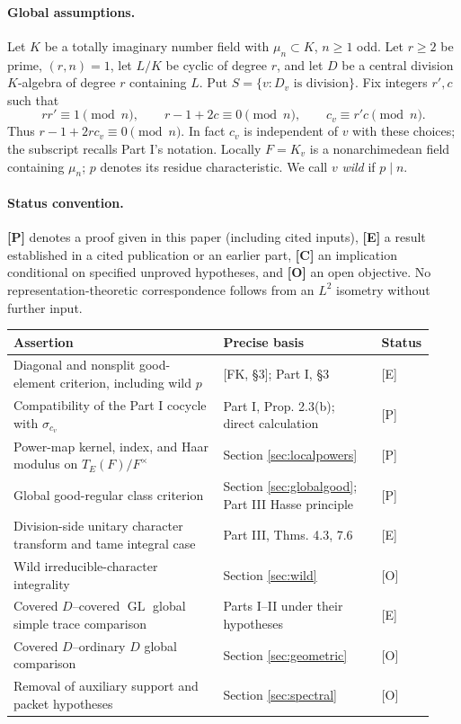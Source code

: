 \documentclass[11pt]{article}
\newcommand{\GL}{\operatorname{GL}}
\theoremstyle{plain}
\theoremstyle{definition}
\begin{document}
\paragraph{Global assumptions.}
Let $K$ be a totally imaginary number field with $\mu_n\subset K$,
$n\geq1$ odd.  Let $r\geq2$ be prime, $(r,n)=1$, let $L/K$ be cyclic
of degree $r$, and let $D$ be a central division $K$-algebra of
degree $r$ containing $L$.  Put $S=\{v:D_v\text{ is division}\}$.
Fix integers $r',c$ such that
\begin{equation}\label{eq:parameters}
 rr'\equiv1\pmod n,\qquad r-1+2c\equiv0\pmod n,
 \qquad c_v\equiv r'c\pmod n.
\end{equation}
Thus $r-1+2rc_v\equiv0\pmod n$.  In fact $c_v$ is independent
of $v$ with these choices; the subscript recalls Part I's notation.
Locally $F=K_v$ is a nonarchimedean field containing $\mu_n$;
$p$ denotes its residue characteristic.  We call $v$ \emph{wild}
if $p\mid n$.

\paragraph{Status convention.}
\textbf{[P]} denotes a proof given in this paper (including cited
inputs), \textbf{[E]} a result established in a cited publication or an
earlier part, \textbf{[C]} an implication conditional on specified
unproved hypotheses, and \textbf{[O]} an open objective.  No
representation-theoretic correspondence follows from an $L^2$ isometry
without further input.

\begin{center}\small
\begin{tabular}{@{}p{0.49\linewidth}p{0.37\linewidth}p{0.07\linewidth}@{}}
\toprule
Assertion & Precise basis & Status\\\midrule
Diagonal and nonsplit good-element criterion, including wild $p$ & [FK, \S3]; Part I, \S3 & [E]\\
Compatibility of the Part I cocycle with $\sigma_{c_v}$ & Part I, Prop. 2.3(b); direct calculation & [P]\\
Power-map kernel, index, and Haar modulus on $T_E(F)/F^\times$ & Section \ref{sec:localpowers} & [P]\\
Global good-regular class criterion & Section \ref{sec:globalgood}; Part III Hasse principle & [P]\\
Division-side unitary character transform and tame integral case & Part III, Thms. 4.3, 7.6 & [E]\\
Wild irreducible-character integrality & Section \ref{sec:wild} & [O]\\
Covered $D$--covered $\GL$ global simple trace comparison & Parts I--II under their hypotheses & [E]\\
Covered $D$--ordinary $D$ global comparison & Section \ref{sec:geometric} & [O]\\
Removal of auxiliary support and packet hypotheses & Section \ref{sec:spectral} & [O]\\
\bottomrule
\end{tabular}
\end{center}
\end{document}
